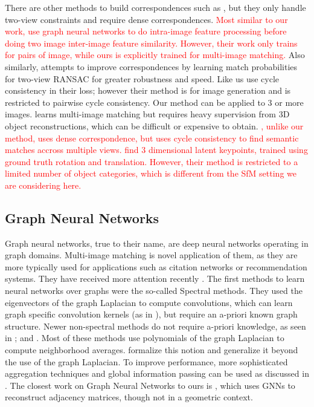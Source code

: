 \documentclass{article} %
\begin{document}
There are other methods to build correspondences such as \cite{choy2016universal}, but they only handle two-view constraints and require dense correspondences.
\textcolor{red}{Most similar to our work, \cite{zhang2019iccv} use graph neural networks to do intra-image feature processing before doing two image inter-image feature similarity. However, their work only trains for pairs of image, while ours is explicitly trained for multi-image matching.}
Also similarly, \cite{yi2018learning} attempts to improve correspondences by learning match probabilities for two-view RANSAC for greater robustness and speed.
Like us \cite{zhu2017unpaired} use cycle consistency in their loss; however their method is for image generation and is restricted to pairwise cycle consistency.
Our method can be applied to 3 or more images. 
\cite{hartmann2017learned} learns multi-image matching but requires heavy supervision from 3D object reconstructions, which can be difficult or expensive to obtain.
\textcolor{red}{\cite{zhou2015flowweb}, unlike our method, uses dense correspondence, but uses cycle consistency to find semantic matches accross multiple views.}
\textcolor{red}{\cite{suwajanakorn2018discovery} find 3 dimensional latent keypoints, trained using ground truth rotation and translation. However, their method is restricted to a limited number of object categories, which is different from the SfM setting we are considering here.}

\subsection{Graph Neural Networks}
Graph neural networks, true to their name, are deep neural networks operating in graph domains.
Multi-image matching is novel application of them, as they are more typically used for applications such as citation networks or recommendation systems.
They have received more attention recently \citep{bronstein2017geometric, defferrard2016convolutional, kipf2017semi, scarselli2009graph, gama2018mimo, gama2018convolutional, battaglia2018relational}.
The first methods to learn neural networks over graphs were the so-called Spectral methods.
They used the eigenvectors of the graph Laplacian to compute convolutions, which can learn graph specific convolution kernels (as in \cite{bruna2013spectral}), but require an a-priori known graph structure. 
Newer non-spectral methods do not require a-priori knowledge, as seen in \cite{bronstein2017geometric, kipf2017semi, scarselli2009graph}; and \cite{gama2018convolutional}.
Most of these methods use polynomials of the graph Laplacian to compute neighborhood averages.
\cite{gama2018mimo, gama2018convolutional} formalize this notion and generalize it beyond the use of the graph Laplacian.
To improve performance, more sophisticated aggregation techniques and global information passing can be used as discussed in \cite{battaglia2018relational}.
The closest work on Graph Neural Networks to ours is \cite{kipf2016variational}, which uses GNNs to reconstruct adjacency matrices, though not in a geometric context.
\end{document}
